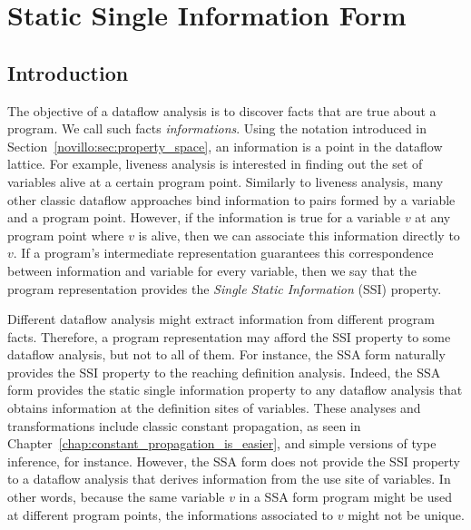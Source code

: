 \chapter{Static Single Information Form }
\label{chap:ssi}

\graphicspath{{img/}{ssi/img/}{part2/ssi/img/}}

\section{Introduction}
\label{sec:ssi:pereira:intro}

The objective of a dataflow analysis is to discover facts that are true about a
program.
We call such facts {\em informations}.
Using the notation introduced in Section~\ref{novillo:sec:property_space}, an
information is a point in the dataflow lattice.
For example, liveness analysis is interested in finding out the set of
variables alive at a certain program point.
Similarly to liveness analysis, many other classic dataflow approaches bind
information to pairs formed by a variable and a program point.
However, if the information is true for a variable $v$ at any program point where
$v$ is alive, then we can associate this information directly to $v$.
If a program's intermediate representation guarantees this correspondence between
information and variable for every variable, then we say that the program
representation provides the {\em Single Static Information} (SSI) property.

Different dataflow analysis might extract information from different program
facts.
Therefore, a program representation may afford the SSI property to some dataflow
analysis, but not to all of them.
For instance, the SSA form naturally provides the SSI property to the reaching
definition analysis.
Indeed, the SSA form provides the static single information property to any
dataflow analysis that obtains information at the definition sites of
variables.
These analyses and transformations include classic constant propagation, as
seen in Chapter~\ref{chap:constant_propagation_is_easier}, and simple versions of
type inference, for instance.
However, the SSA form does not provide the SSI property to a dataflow analysis
that derives information from the use site of variables.
In other words, because the same variable $v$ in a SSA form program might be used
at different program points, the informations associated to $v$ might not be
unique.

